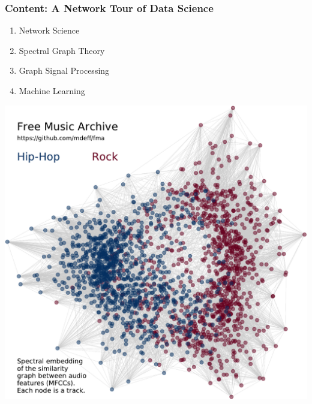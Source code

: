 \documentclass[aspectratio=169]{beamer}
\begin{document}
\begin{frame}
	\frametitle{Content: \textbf{A Network Tour} of Data Science}
	\begin{minipage}{0.4\linewidth}
		\begin{enumerate}
			\item Network Science
			\vspace{2em}
			\item Spectral Graph Theory
			\vspace{2em}
			\item Graph Signal Processing
			\vspace{2em}
			\item Machine Learning
		\end{enumerate}
	\end{minipage}
	\hfill
	\begin{minipage}{0.57\linewidth}
		\includegraphics[width=\linewidth]{fma_illustration}
	\end{minipage}
\end{frame}

\end{document}
